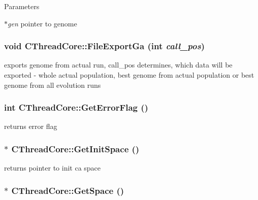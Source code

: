\begin{DoxyParams}{Parameters}
\item[{\em $\ast$gen}]pointer to genome \end{DoxyParams}
\hypertarget{classCThreadCore_ad76c05c9748da357d926c66a52fecfdc}{
\subsubsection[{FileExportGa}]{\setlength{\rightskip}{0pt plus 5cm}void CThreadCore::FileExportGa (int {\em call\_\-pos})}}
\label{classCThreadCore_ad76c05c9748da357d926c66a52fecfdc}
exports genome from actual run, call\_\-pos determines, which data will be exported -\/ whole actual population, best genome from actual population or best genome from all evolution runs \hypertarget{classCThreadCore_a584f4b6a6afec6903ca7cb5f9eac96b2}{
\subsubsection[{GetErrorFlag}]{\setlength{\rightskip}{0pt plus 5cm}int CThreadCore::GetErrorFlag ()}}
\label{classCThreadCore_a584f4b6a6afec6903ca7cb5f9eac96b2}
returns error flag \hypertarget{classCThreadCore_aab198fc60402f7c65e5085404d9b75ae}{
\subsubsection[{GetInitSpace}]{ $\ast$ CThreadCore::GetInitSpace ()}}
\label{classCThreadCore_aab198fc60402f7c65e5085404d9b75ae}
returns pointer to init ca space \hypertarget{classCThreadCore_ae65e6c5c661c97f58d795907da19377a}{
\subsubsection[{GetSpace}]{ $\ast$ CThreadCore::GetSpace ()}}
\label{classCThreadCore_ae65e6c5c661c97f58d795907da19377a}
